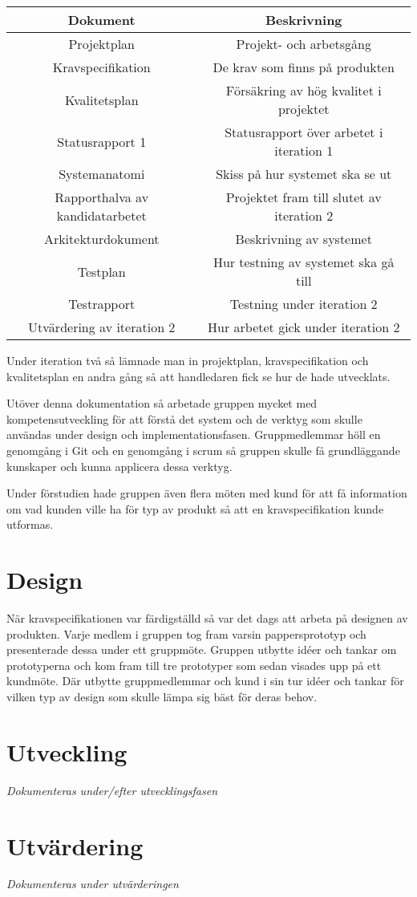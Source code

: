 \begin{center}
\begin{tabular}{|c|c|}
\hline
\textbf{Dokument} & \textbf{Beskrivning} \\
\hline
Projektplan & Projekt- och arbetsgång \\
\hline
Kravspecifikation & De krav som finns på produkten \\
\hline
Kvalitetsplan & Försäkring av hög kvalitet i projektet \\
\hline
Statusrapport 1 & Statusrapport över arbetet i iteration 1 \\
\hline
Systemanatomi & Skiss på hur systemet ska se ut \\
\hline
Rapporthalva av kandidatarbetet & Projektet fram till slutet av iteration 2 \\
\hline
Arkitekturdokument & Beskrivning av systemet \\
\hline
Testplan & Hur testning av systemet ska gå till \\
\hline
Testrapport & Testning under iteration 2 \\
\hline
Utvärdering av iteration 2 & Hur arbetet gick under iteration 2 \\
\hline
\end{tabular}
\end{center}

Under iteration två så lämnade man in projektplan, kravspecifikation och kvalitetsplan en andra gång så att handledaren fick se hur de hade utvecklats.

Utöver denna dokumentation så arbetade gruppen mycket med kompetensutveckling för att förstå det system och de verktyg som skulle användas under design och implementationsfasen. Gruppmedlemmar höll en genomgång i Git och en genomgång i scrum så gruppen skulle få grundläggande kunskaper och kunna applicera dessa verktyg.

Under förstudien hade gruppen även flera möten med kund för att få information om vad kunden ville ha för typ av produkt så att en kravspecifikation kunde utformas.

\section{Design}
När kravspecifikationen var färdigställd så var det dags att arbeta på designen av produkten. Varje medlem i gruppen tog fram varsin pappersprototyp och presenterade dessa under ett gruppmöte. Gruppen utbytte idéer och tankar om prototyperna och kom fram till tre prototyper som sedan visades upp på ett kundmöte. Där utbytte gruppmedlemmar och kund i sin tur idéer och tankar för vilken typ av design som skulle lämpa sig bäst för deras behov.

\section{Utveckling}
\textit{Dokumenteras under/efter utvecklingsfasen}

\section{Utvärdering}
\textit{Dokumenteras under utvärderingen}
